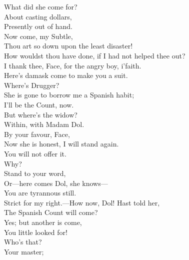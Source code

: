 \documentclass[a4paper,oneside,12pt]{memoir}
\begin{document}
\begin{drama*}
\facespeaks What did she come for?\\
\subtlespeaks {} About casting dollars,\\
Presently out of hand.\\
\facespeaks {} Now come, my Subtle,\\
Thou art so down upon the least disaster!\\
How wouldst thou have done, if I had not helped thee out?\\
\subtlespeaks I thank thee, Face, for the angry boy, i'faith.\\
\facespeaks Here's damask come to make you a suit.\\
\subtlespeaks {} Where's Drugger?\\
\facespeaks She is gone to borrow me a Spanish habit;\\
I'll be the Count, now.\\
\subtlespeaks {} But where's the widow?\\
\facespeaks Within, with Madam Dol.\\
\subtlespeaks {} By your favour, Face,\\
Now she is honest, I will stand again.\\
\facespeaks You will not offer it.\\
\subtlespeaks {} Why?\\
\facespeaks {} Stand to your word,\\
Or---here comes Dol, she knows---\\
\subtlespeaks {} You are tyrannous still.\\
\facespeaks Strict for my right.---How now, Dol! Hast told her,\\
The Spanish Count will come?\\
\dolspeaks {} Yes; but another is come,\\
You little looked for!\\
\facespeaks {} Who's that?\\
\dolspeaks {} Your master;\\

\end{drama*}
\end{document}
